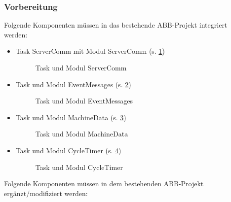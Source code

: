 \subsubsection{Vorbereitung}
Folgende Komponenten müssen in das bestehende ABB-Projekt 
integriert werden:
\begin{itemize}
\item Task ServerComm mit Modul ServerComm (s. \ref{fig:taskServerComm})
\begin{figure}[H]
	\centering
	\caption[Task und Modul ServerComm]{Task und Modul ServerComm}
	\label{fig:taskServerComm}
\end{figure}
\item Task und Modul EventMessages (s. \ref{fig:taskEventMessages})
\begin{figure}[H]
	\centering
	\caption[Task und Modul EventMessages]{Task und Modul EventMessages}
	\label{fig:taskEventMessages}
	\end{figure}
\item Task und Modul MachineData (s. \ref{fig:taskMachineData})
	\begin{figure}[H]
		\centering
		\caption[Task und Modul MachineData]{Task und Modul MachineData}
		\label{fig:taskMachineData}
		\end{figure}
\item Task und Modul CycleTimer (s. \ref{fig:taskCycleTimer})
\begin{figure}[H]
	\centering
	\caption[Task und Modul CycleTimer]{Task und Modul CycleTimer}
	\label{fig:taskCycleTimer}
\end{figure}

\end{itemize}  
Folgende Komponenten müssen in dem bestehenden ABB-Projekt 
ergänzt/modifiziert werden:
